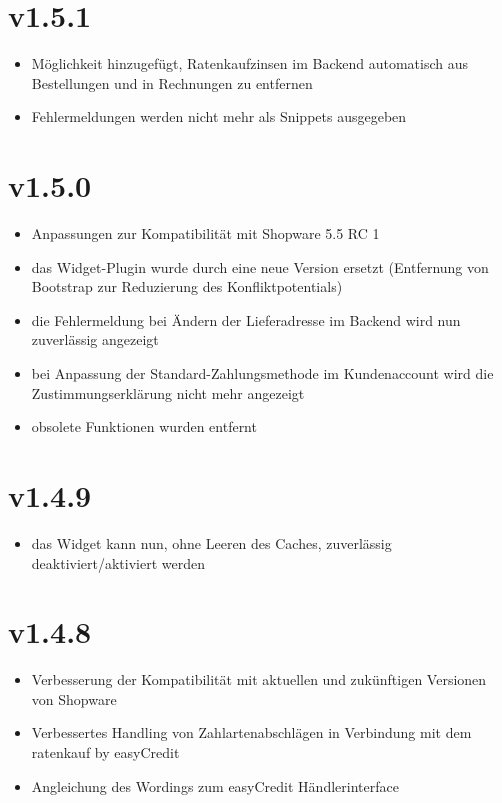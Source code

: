 \documentclass[a4paper,10pt,openany,oneside,ngerman]{sphinxmanual}
\begin{document}
\section{v1.5.1}
\label{\detokenize{changelog:v1-5-1}}\begin{itemize}
\item {} 
Möglichkeit hinzugefügt, Ratenkaufzinsen im Backend automatisch aus Bestellungen und in Rechnungen zu entfernen

\item {} 
Fehlermeldungen werden nicht mehr als Snippets ausgegeben

\end{itemize}


\section{v1.5.0}
\label{\detokenize{changelog:v1-5-0}}\begin{itemize}
\item {} 
Anpassungen zur Kompatibilität mit Shopware 5.5 RC 1

\item {} 
das Widget-Plugin wurde durch eine neue Version ersetzt (Entfernung von Bootstrap zur Reduzierung des Konfliktpotentials)

\item {} 
die Fehlermeldung bei Ändern der Lieferadresse im Backend wird nun zuverlässig angezeigt

\item {} 
bei Anpassung der Standard-Zahlungsmethode im Kundenaccount wird die Zustimmungserklärung nicht mehr angezeigt

\item {} 
obsolete Funktionen wurden entfernt

\end{itemize}


\section{v1.4.9}
\label{\detokenize{changelog:v1-4-9}}\begin{itemize}
\item {} 
das Widget kann nun, ohne Leeren des Caches, zuverlässig deaktiviert/aktiviert werden

\end{itemize}


\section{v1.4.8}
\label{\detokenize{changelog:v1-4-8}}\begin{itemize}
\item {} 
Verbesserung der Kompatibilität mit aktuellen und zukünftigen Versionen von Shopware

\item {} 
Verbessertes Handling von Zahlartenabschlägen in Verbindung mit dem ratenkauf by easyCredit

\item {} 
Angleichung des Wordings zum easyCredit Händlerinterface

\end{itemize}
\end{document}
